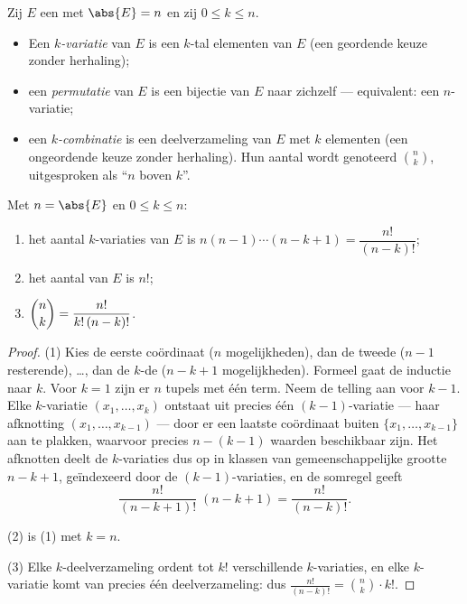 \begin{definition}\label{def:b1:counting:objects}
Zij $E$ een  met $\abs{E} = n$ en zij $0 \leq k \leq n$.
\begin{itemize}
  \item Een \emph{$k$-variatie} van $E$ is een  $k$-tal
        elementen van $E$ (een geordende keuze zonder herhaling);
  \item een \emph{permutatie} van $E$ is een bijectie
        van $E$ naar zichzelf --- equivalent: een $n$-variatie;
  \item een \emph{$k$-combinatie} is een deelverzameling van $E$ met $k$
        elementen (een ongeordende keuze zonder herhaling). Hun aantal
        wordt genoteerd $\binom{n}{k}$, uitgesproken als ``$n$ boven
        $k$''.
\end{itemize}
\end{definition}

\begin{theorem}\label{thm:b1:counting:counts}
Met $n = \abs{E}$ en $0 \leq k \leq n$:
\begin{enumerate}
  \item het aantal $k$-variaties van $E$ is $n (n-1) \cdots (n-k+1) =
        \dfrac{n!}{(n-k)!}$;
  \item het aantal  van $E$ is $n!$;
  \item $\dbinom{n}{k} = \dfrac{n!}{k!\,(n-k)!}$.
\end{enumerate}
\end{theorem}

\begin{proof}
(1) Kies de eerste coördinaat ($n$ mogelijkheden), dan de tweede ($n -
1$ resterende), \dots, dan de $k$-de ($n - k + 1$ mogelijkheden).
Formeel gaat de inductie naar $k$. Voor $k = 1$ zijn er $n$ 
tupels met één term. Neem de telling aan voor $k - 1$. Elke
$k$-variatie $(x_1, \dots, x_k)$ ontstaat uit precies één
$(k-1)$-variatie --- haar afknotting $(x_1, \dots, x_{k-1})$ --- door
er een laatste coördinaat buiten $\{x_1, \dots, x_{k-1}\}$ aan te
plakken, waarvoor precies $n - (k - 1)$ waarden beschikbaar zijn. Het
afknotten deelt de $k$-variaties dus op in klassen van gemeenschappelijke
grootte $n - k + 1$, geïndexeerd door de $(k-1)$-variaties, en de
somregel geeft
\[
\frac{n!}{(n-k+1)!}\;(n - k + 1) = \frac{n!}{(n-k)!} .
\]

(2) is (1) met $k = n$.

(3) Elke $k$-deelverzameling ordent tot $k!$ verschillende
$k$-variaties, en elke $k$-variatie komt van precies één
deelverzameling: dus $\frac{n!}{(n-k)!} = \binom nk \cdot k!$.
\end{proof}

